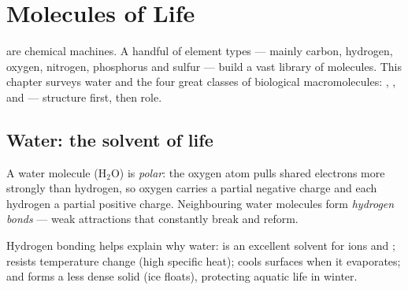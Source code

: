 \chapter{Molecules of Life}\label{ch:g10:molecules-of-life}

 are chemical machines. A handful of element types --- mainly
carbon, hydrogen, oxygen, nitrogen, phosphorus and sulfur --- build a
vast library of molecules. This chapter surveys water and the four great
classes of biological macromolecules: , , 
and  --- structure first, then role.

\section{Water: the solvent of life}

\begin{definition}\label{def:g10:molecules-of-life:water}
A water molecule ($\mathrm{H_2O}$) is \emph{polar}: the
oxygen atom pulls shared electrons more strongly than hydrogen, so oxygen
carries a partial negative charge and each hydrogen a partial positive
charge. Neighbouring water molecules form \emph{hydrogen
bonds} --- weak attractions that constantly break
and reform.
\end{definition}

\begin{proposition}\label{prop:g10:molecules-of-life:water-props}
Hydrogen bonding helps explain why water: is an excellent solvent for
ions and ; resists temperature change (high specific heat);
cools surfaces when it evaporates; and forms a less dense solid (ice
floats), protecting aquatic life in winter.
\end{proposition}
\admitted

